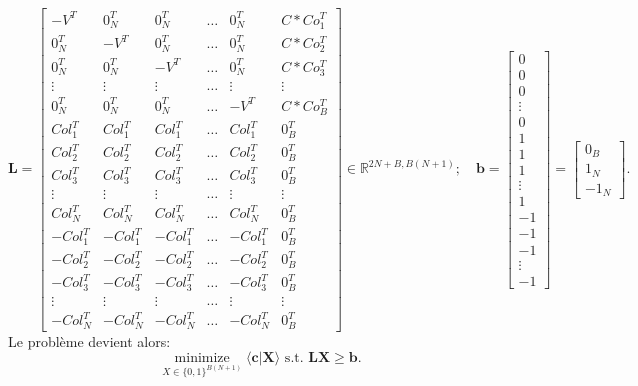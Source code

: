 \[
\mathbf{L} = 
\begin{bmatrix}
    -V^T & 0_N^T & 0_N^T & \ldots & 0_N^T & C*Co_1^T \\
    0_N^T & -V^T & 0_N^T & \ldots & 0_N^T & C*Co_2^T \\ 
    0_N^T & 0_N^T & -V^T & \ldots & 0_N^T & C*Co_3^T \\
    \vdots & \vdots & \vdots & \ldots & \vdots & \vdots \\
    0_N^T & 0_N^T & 0_N^T & \ldots & -V^T & C*Co_B^T \\
    Col_1^T & Col_1^T & Col_1^T & \ldots & Col_1^T & 0_B^T \\
    Col_2^T & Col_2^T & Col_2^T & \ldots & Col_2^T & 0_B^T \\
    Col_3^T & Col_3^T & Col_3^T & \ldots & Col_3^T & 0_B^T \\
    \vdots & \vdots & \vdots & \ldots & \vdots & \vdots \\
    Col_N^T & Col_N^T & Col_N^T & \ldots & Col_N^T & 0_B^T \\
    -Col_1^T & -Col_1^T & -Col_1^T & \ldots & -Col_1^T & 0_B^T \\
    -Col_2^T & -Col_2^T & -Col_2^T & \ldots & -Col_2^T & 0_B^T \\
    -Col_3^T & -Col_3^T & -Col_3^T & \ldots & -Col_3^T & 0_B^T \\
    \vdots & \vdots & \vdots & \ldots & \vdots & \vdots \\
    -Col_N^T & -Col_N^T & -Col_N^T & \ldots & -Col_N^T & 0_B^T
\end{bmatrix} \in \mathbb{R}^{2N+B, B(N+1)}; \quad
\mathbf{b} = 
\begin{bmatrix}
    0 \\
    0 \\
    0 \\
    \vdots \\
    0 \\
    1 \\
    1 \\
    1 \\
    \vdots \\
    1 \\
    -1 \\
    -1 \\
    -1 \\
    \vdots \\
    -1
\end{bmatrix} = 
\begin{bmatrix}
    0_B \\
    1_N \\
    -1_N 
\end{bmatrix}.
\]
Le problème devient alors:
\[\boxed{
\underset{X \in \{0, 1\}^{B(N+1)}}{\operatorname{minimize}} \langle \mathbf{c} | \mathbf{X} \rangle \text{ s.t. } \mathbf{L} \mathbf{X} \ge \mathbf{b}.}
\]

